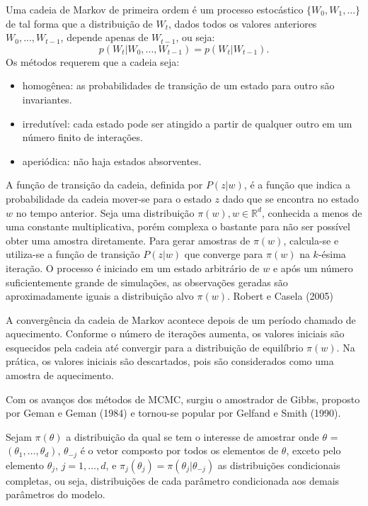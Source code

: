 \documentclass[12pt,a4paper,header]{abnt}
\begin{document}
Uma cadeia de Markov de primeira ordem é um processo estocástico $\{W_0,W_1,...\}$ de tal forma que a distribuição de $W_t$, dados todos os valores anteriores $W_0,...,W_{t-1}$, depende apenas de $W_{t-1}$, ou seja:
$$  p(W_t |W_0,...,W_{t-1} )=p(W_t | W_{t-1}) . $$
Os métodos requerem que a cadeia seja:

\begin{itemize}
\item homogênea: as probabilidades de transição de um estado para outro são invariantes.
\item irredutível: cada estado pode ser atingido a partir de qualquer outro em um número finito de interações.
\item aperiódica: não haja estados absorventes.
\end{itemize}

A função de transição da cadeia, definida por $P(z|w)$, é a função que indica a probabilidade
da cadeia mover-se para o estado $z$ dado que se encontra no estado $w$ no tempo anterior. Seja uma distribuição $\pi(w), w \in \mathbb{R}^{d}$, conhecida a menos de uma constante multiplicativa, porém complexa o bastante para não ser possível obter uma amostra diretamente. Para gerar amostras de $\pi(w)$, calcula-se e utiliza-se a função de transição $P(z|w)$ que converge para $\pi(w)$ na $k$-ésima iteração. O processo é iniciado em um estado arbitrário de $w$ e após um número suficientemente grande de simulações, as observações geradas são aproximadamente iguais a distribuição alvo $\pi(w)$. Robert e Casela (2005)\cite{robert_casella}


A convergência da cadeia de Markov acontece depois de um período chamado de
aquecimento. Conforme o número de iterações aumenta, os valores iniciais são esquecidos
pela cadeia até convergir para a distribuição de equilíbrio $\pi(w)$. Na prática, os valores iniciais são descartados, pois são considerados como uma amostra de aquecimento.


Com os avanços dos métodos de \ac{MCMC}, surgiu o amostrador de Gibbs, proposto por Geman e Geman (1984)\cite{GemanGeman} e tornou-se popular por  Gelfand e Smith (1990)\cite{GelfandSmith}.

Sejam $\pi(\theta)$ a distribuição da qual se tem o interesse de amostrar onde \textbf{$\theta$} = $(\theta_1, \ldots, \theta_d)$, $\theta_{-j}$ é o vetor composto por todos os elementos de $\theta$, exceto pelo elemento $\theta_j$, $j = 1,\ldots,d$, e $\pi_j(\theta_j)=\pi(\theta_j | \theta_{-j})$ as distribuições condicionais completas, ou seja, distribuições de cada parâmetro condicionada aos demais parâmetros do modelo.
\end{document}
